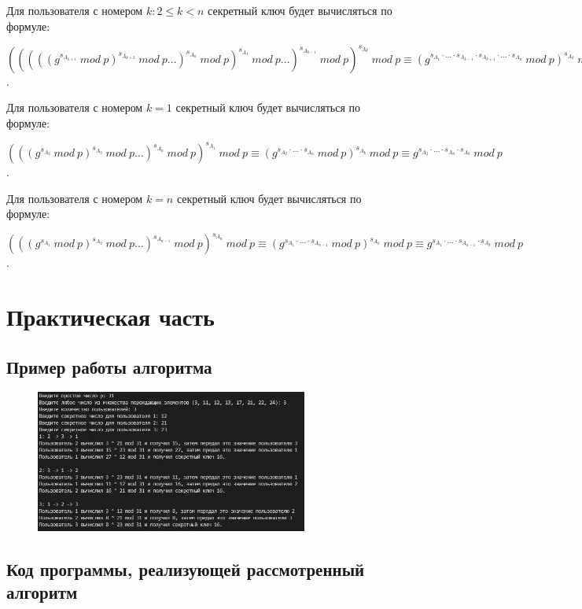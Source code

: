\documentclass[bachelor, och, labwork]{shiza}
\begin{document}
Для пользователя с номером $k: 2 \leq k < n$ секретный ключ будет вычисляться по
формуле:
\begin{center} $(((((g ^ {s_{A_{k+1}}} ~ mod ~ p) ^ {s_{A_{k+2}}} ~ mod ~ p ...) ^ 
    {s_{A_n}} ~ mod ~ p) ^ {s_{A_1}} ~ mod ~ p...)^ {s_{A_{k-1}}} ~ mod ~ p) ^ 
    {s_{A_k}} ~ mod ~ p \equiv (g^{s_{A_1}\cdot ... \cdot s_{A_{k-1}} \cdot 
    s_{A_{k+1}} \cdot ... \cdot s_{A_{n}}} ~mod ~p) ^ {s_{A_k}} ~mod ~ p
    \equiv g^{s_{A_{1}}\cdot ... \cdot s_{A_{k-1}} \cdot s_{A_{k+1}} \cdot ... \cdot s_{A_{n}} \cdot {s_{A_k}}} ~mod ~ p$.
\end{center}

Для пользователя с номером $k=1$ секретный ключ будет вычисляться по
формуле:
\begin{center} 
    $(((g ^ {s_{A_2}} ~ mod ~ p)^ {s_{A_3}} ~mod ~p...)^ {s_{A_n}} ~ mod ~ p) ^ 
    {s_{A_1}} ~ mod ~ p  \equiv (g^{s_{A_2}\cdot ... \cdot s_{A_{n}}} ~mod ~ p) ^ 
    {s_{A_k}} ~mod ~ p \equiv g^{s_{A_2}\cdot ... \cdot s_{A_{n}} \cdot {s_{A_k}}} ~mod ~ p$.

\end{center}
Для пользователя с номером $k=n$ секретный ключ будет вычисляться по
формуле:
\begin{center} 
    $(((g ^ {s_{A_1}} ~ mod ~ p)^ {s_{A_2}} ~mod ~p...)^ {s_{A_{n-1}}} ~ mod ~ p) ^
     {s_{A_n}} ~ mod ~ p \equiv (g^{s_{A_1}\cdot ... \cdot s_{A_{n - 1}}} ~mod ~ p) ^ 
     {s_{A_k}} ~mod ~ p \equiv g^{s_{A_1}\cdot ... \cdot s_{A_{n-1}} \cdot {s_{A_k}}} ~mod ~ p$.
\end{center}

\section{Практическая часть}
\subsection{Пример работы алгоритма}
\begin{figure}[H]
    \centering
    \includegraphics[width=0.8\textwidth]{pic.jpg}
    \caption{}
\end{figure}

    \subsection{Код программы, реализующей рассмотренный алгоритм}
        \inputminted{python}{lab6.py}
\end{document}
